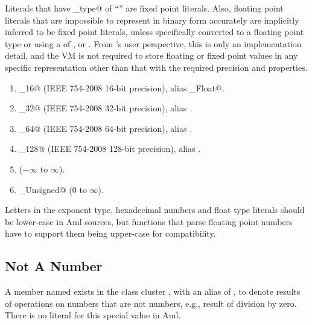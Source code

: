 Literals that have \lstinline@float_type@ of ``'' are fixed point literals. Also, floating point literals that are impossible to represent in binary form accurately are implicitly inferred to be fixed point literals, unless specifically converted to a floating point type or using a  of ,  or . From 's user perspective, this is only an implementation detail, and the VM is not required to store floating or fixed point values in any specific representation other than that with the required precision and properties. 

\begin{enumerate}

  \item \lstinline@Float_16@ (IEEE 754-2008 16-bit precision), alias \lstinline@Half_Float@. 
  
  \item \lstinline@Float_32@ (IEEE 754-2008 32-bit precision), alias \lstinline@Float@. 

  \item \lstinline@Float_64@ (IEEE 754-2008 64-bit precision), alias \lstinline@Double@.

  \item \lstinline@Float_128@ (IEEE 754-2008 128-bit precision), alias \lstinline@Quadruple@.

  \item \lstinline@Decimal@ ($-\infty$ to $\infty$).

  \item \lstinline@Decimal_Unsigned@ ($0$ to $\infty$).

\end{enumerate}

Letters in the exponent type, hexadecimal numbers and float type literals should be lower-case in Aml sources, but functions that parse floating point numbers have to support them being upper-case for compatibility. 





\subsection{Not A Number}
\label{sec:nan}

A member named  exists in the class cluster , with an alias of , to denote results of operations on numbers that are not numbers, e.g., result of division by zero. There is no literal for this special value in Aml. 





